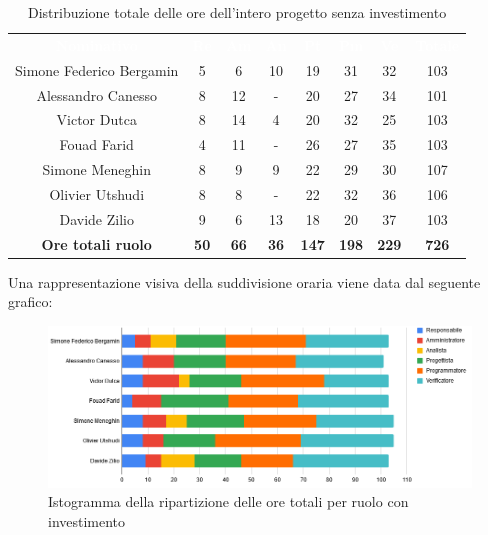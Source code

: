 \begin{table}[H]
\centering\renewcommand{\arraystretch}{1.5}
\caption{Distribuzione totale delle ore dell'intero progetto senza investimento}
\vspace{0.2cm}
\begin{tabular}{ c | c | c | c | c | c | c | c }
\rowcolor{redafk}
\textcolor{white}{\textbf{Nominativo}} & \textcolor{white}{\textbf{Re}} & 
\textcolor{white}{\textbf{Am}} & \textcolor{white}{\textbf{An}} &
\textcolor{white}{\textbf{Pt}} & \textcolor{white}{\textbf{Pm}} &
\textcolor{white}{\textbf{Ve}} & \textcolor{white}{\textbf{Totale}} \\
Simone Federico Bergamin 	& 5 	& 6 	& 10	& 19	& 31	& 32 	& 103 \\
Alessandro Canesso 			& 8 	& 12	& - 	& 20	& 27	& 34 	& 101 \\
Victor Dutca 				& 8 	& 14	& 4 	& 20	& 32	& 25 	& 103 \\
Fouad Farid					& 4 	& 11	& - 	& 26	& 27	& 35 	& 103 \\
Simone Meneghin 			& 8 	& 9 	& 9 	& 22	& 29	& 30 	& 107 \\
Olivier Utshudi 			& 8 	& 8 	& - 	& 22	& 32	& 36 	& 106 \\
Davide Zilio 				& 9 	& 6 	& 13	& 18	& 20	& 37 	& 103 \\
\rowcolor{lastrowcolor}
\textbf{Ore totali ruolo} & \textbf{50} & \textbf{66} & \textbf{36} & \textbf{147} & \textbf{198} & \textbf{229} & \textbf{726} \\
\end{tabular}
\end{table}

Una rappresentazione visiva della suddivisione oraria viene data dal seguente grafico:
\begin{figure}[H]
\centering
\includegraphics[scale=0.60]{img/grafici/tabella_tot_no_analisi.png}
\caption{Istogramma della ripartizione delle ore totali per ruolo con investimento}
\end{figure}


